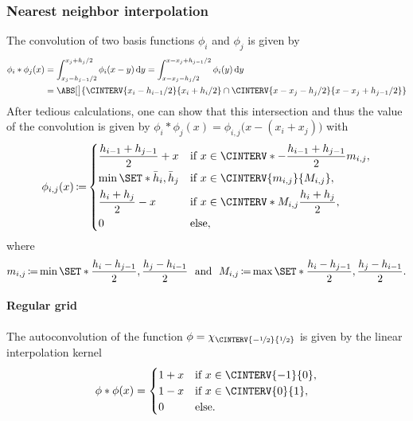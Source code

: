\documentclass[a4paper]{paper}
\DeclareMathOperator{\DEFEQ}{{\coloneqq}}
\newcommand*{\D}{{\ensuremath{\mathrm{d}}}}
\begin{document}
\subsubsection{Nearest neighbor interpolation}
\label{subsubsec:specif:conv:nn}

The convolution of two basis functions $\phi_i$ and $\phi_j$ is given by
%
\begin{align*}
 \phi_i \ast \phi_j(x) 
 &= \int_{x_j-h_{j-1}/2}^{x_j+h_j/2} \phi_i(x-y)\, \D y 
 = \int_{x-x_j-h_j/2}^{x-x_j+h_{j-1}/2} \phi_i(y)\, \D y \\
 &= \ABS[\big]{\CINTERV{x_i-h_{i-1}/2}{x_i+h_i/2} \cap \CINTERV{x-x_j-h_j/2}{x-x_j+h_{j-1}/2}}
\end{align*}
%
After tedious calculations, one can show that this intersection and thus the value of the convolution is given by
$\phi_i \ast \phi_j(x) = \phi_{i,j}\big( x - (x_i + x_j) \big)$ with
%
\begin{equation*}
 \phi_{i,j}(x) \DEFEQ
 \begin{dcases}
  \frac{h_{i-1} + h_{j-1}}{2} + x & \text{if } x \in \CINTERV*{-\frac{h_{i-1} + h_{j-1}}{2}}{m_{i,j}}, \\
  \min\SET*{\bar h_i, \bar h_j} & \text{if } x \in \CINTERV{m_{i,j}}{M_{i,j}}, \\
  \frac{h_i + h_j}{2} - x & \text{if } x \in \CINTERV*{M_{i,j}}{\frac{h_i + h_j}{2}}, \\
  0 & \text{else},
 \end{dcases}
\end{equation*}
%
where
%
\begin{equation*}
 m_{i,j} \DEFEQ \min\SET*{\frac{h_i - h_{j-1}}{2}, \frac{h_j - h_{i-1}}{2}}
 \ \ \text{and}\ \ 
 M_{i,j} \DEFEQ \max\SET*{\frac{h_i - h_{j-1}}{2}, \frac{h_j - h_{i-1}}{2}}.
\end{equation*}


\paragraph{Regular grid}

The autoconvolution of the function $\phi = \chi_{\CINTERV{-\nicefrac{1}{2}}{\nicefrac{1}{2}}}$ is given by the linear 
interpolation kernel
%
\begin{equation*}
 \phi \ast \phi(x) = 
 \begin{cases}
  1 + x & \text{if } x \in \CINTERV{-1}{0}, \\
  1 - x & \text{if } x \in \CINTERV{0}{1}, \\
  0 & \text{else.}
 \end{cases}
\end{equation*}
\end{document}
